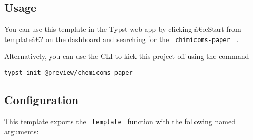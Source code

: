 \subsection{Usage}\label{usage}

You can use this template in the Typst web app by clicking â€œStart from
templateâ€? on the dashboard and searching for the
\texttt{\ chimicoms-paper\ } .

Alternatively, you can use the CLI to kick this project off using the
command

\begin{verbatim}
typst init @preview/chemicoms-paper
\end{verbatim}

\subsection{Configuration}\label{configuration}

This template exports the \texttt{\ template\ } function with the
following named arguments:

